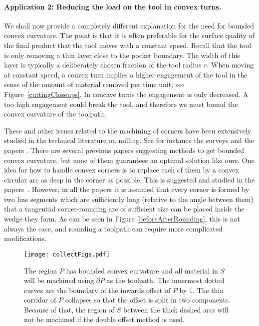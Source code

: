 \documentclass{article}
\newcommand{\PP}{P}
\begin{document}
\paragraph{Application 2: Reducing the load on the tool in convex turns.}
We shall now provide a completely different explanation for the need
for bounded convex curvature. The point is that it is often preferable
for the surface quality of the final product that the tool moves with a constant
speed. Recall that the tool is only removing a thin layer
close to the pocket boundary. The width of this layer is typically a
deliberately chosen fraction of the tool radius $r$.
When moving at constant speed, a convex
turn implies a higher engagement of the tool in the sense of the amount of
material removed per time unit; see Figure~\ref{cuttingCloseups}.
In concave turns the engagement is only decreased.  A too high
engagement could break the tool, and therefore we must bound the
convex curvature of the toolpath.

These and other issues related to the machining of corners have been extensively studied in the technical literature on milling.
See for instance the surveys \cite{hatna1998automatic,toh2004study} and
the papers \cite{burek2019simulation,burek2019numerical,choy2003corner,han2015precise,
iwabe1994study,pateloup2004corner,shixiong2018tool,tong2018prediction,zhao2007pocketing}.
There are several previous papers suggesting methods to get bounded
convex curvature, but none of them guarantees an optimal solution like
ours. One idea for how to handle convex corners is to replace each
of them by a convex circular arc as deep in the corner
as possible. This is suggested and studied
in the papers~\cite{choy2003corner,iwabe1994study,pateloup2004corner,shixiong2018tool}.
However, in all the papers it is assumed that every corner is formed by two
line segments which are
sufficiently long (relative to the angle between them) that a tangential
corner-rounding arc of sufficient size can be placed inside the wedge 
they form.
As can be seen in Figure \ref{beforeAfterRounding}, this is not always the case,
and rounding a toolpath can require more complicated modifications.

\begin{figure}
\centering
\texttt{[image: collectFigs.pdf]}
\caption{The region $\PP$
has bounded convex curvature and all material in $S$ will be machined using $\partial\PP$
as the toolpath.
The innermost dotted curves are the boundary of the inwards offset of $\PP$ by $1$.
The thin corridor of $\PP$ collapses so that the offset is split in two components.
Because of that, the region of $S$ between the thick dashed arcs will not be machined if the double offset method is used.}
\label{boneFig}
\end{figure}
\end{document}
